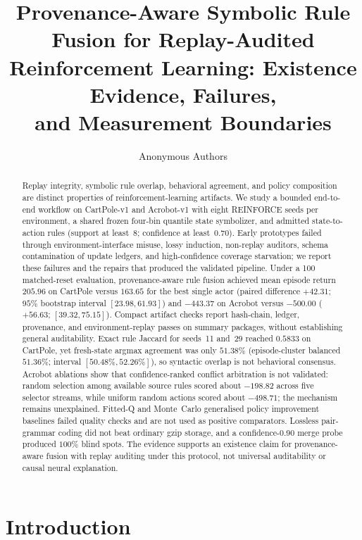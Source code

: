 \documentclass[11pt,a4paper]{article}
\title{Provenance-Aware Symbolic Rule Fusion for Replay-Audited\\
Reinforcement Learning: Existence Evidence, Failures,\\
and Measurement Boundaries}
\author{Anonymous Authors}
\date{}
\begin{document}
\maketitle

\begin{abstract}
Replay integrity, symbolic rule overlap, behavioral agreement, and policy composition are distinct properties of reinforcement-learning artifacts.
We study a bounded end-to-end workflow on CartPole-v1 and Acrobot-v1 with eight REINFORCE seeds per environment, a shared frozen four-bin quantile state symbolizer, and admitted state-to-action rules (support at least~8; confidence at least~0.70).
Early prototypes failed through environment-interface misuse, lossy induction, non-replay auditors, schema contamination of update ledgers, and high-confidence coverage starvation; we report these failures and the repairs that produced the validated pipeline.
Under a 100 matched-reset evaluation, provenance-aware rule fusion achieved mean episode return \(205.96\) on CartPole versus \(163.65\) for the best single actor (paired difference \(+42.31\); \(95\%\) bootstrap interval \([23.98,61.93]\)) and \(-443.37\) on Acrobot versus \(-500.00\) (\( +56.63\); \([39.32,75.15]\)).
Compact artifact checks report hash-chain, ledger, provenance, and environment-replay passes on summary packages, without establishing general auditability.
Exact rule Jaccard for seeds~11 and~29 reached \(0.5833\) on CartPole, yet fresh-state argmax agreement was only \(51.38\%\) (episode-cluster balanced \(51.36\%\); interval \([50.48\%,52.26\%]\)), so syntactic overlap is not behavioral consensus.
Acrobot ablations show that confidence-ranked conflict arbitration is not validated: random selection among available source rules scored about \(-198.82\) across five selector streams, while uniform random actions scored about \(-498.71\); the mechanism remains unexplained.
Fitted-Q and Monte~Carlo generalised policy improvement baselines failed quality checks and are not used as positive comparators.
Lossless pair-grammar coding did not beat ordinary gzip storage, and a confidence-\(0.90\) merge probe produced \(100\%\) blind spots.
The evidence supports an existence claim for provenance-aware fusion with replay auditing under this protocol, not universal auditability or causal neural explanation.
\end{abstract}

\section{Introduction}
\label{sec:intro}
\end{document}
